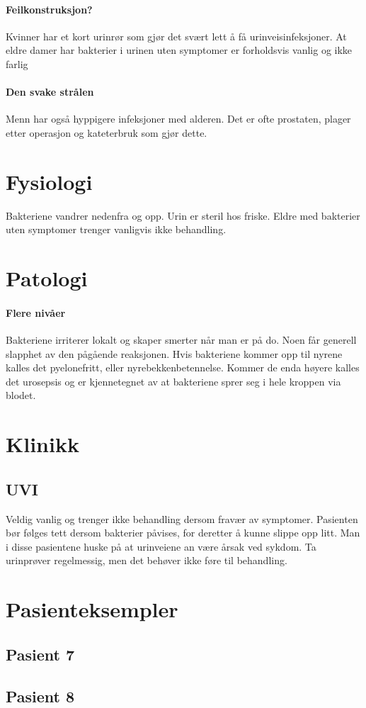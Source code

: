 			\paragraph{Feilkonstruksjon?\\}
				Kvinner har et kort urinrør som gjør det svært lett å få urinveisinfeksjoner. At eldre damer har bakterier i urinen uten symptomer er forholdsvis vanlig og ikke farlig\cite{uti-old}
			\paragraph{Den svake strålen\\}
				Menn har også hyppigere infeksjoner med alderen. Det er ofte prostaten, plager etter operasjon og kateterbruk som gjør dette. 
		\section{Fysiologi}
			Bakteriene vandrer nedenfra og opp. Urin er steril hos friske. Eldre med bakterier uten symptomer trenger vanligvis ikke behandling. 
		\section{Patologi}
			\paragraph{Flere nivåer\\}
				Bakteriene irriterer lokalt og skaper smerter når man er på do. Noen får generell slapphet av den pågående reaksjonen. Hvis bakteriene kommer opp til nyrene kalles det pyelonefritt, eller nyrebekkenbetennelse. Kommer de enda høyere kalles det urosepsis og er kjennetegnet av at bakteriene sprer seg i hele kroppen via blodet. 
		\section{Klinikk}
			\subsection{UVI}
				Veldig vanlig og trenger ikke behandling dersom fravær av symptomer. Pasienten bør følges tett dersom bakterier påvises, for deretter å kunne slippe opp litt. Man i disse pasientene huske på at urinveiene an være årsak ved sykdom. Ta urinprøver regelmessig, men det behøver ikke føre til behandling.
		\section{Pasienteksempler}
			\subsection{Pasient 7}
			\subsection{Pasient 8}